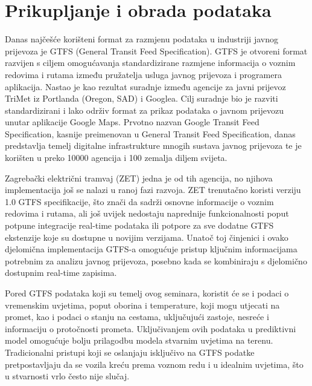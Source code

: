\documentclass[seminarskirad]{fer}
\begin{document}
\chapter{Prikupljanje i obrada podataka}
\label{pog:prikupljanje}

Danas najčešće korišteni format za razmjenu podataka u industriji javnog prijevoza je GTFS (General Transit Feed Specification). GTFS je otvoreni format razvijen s ciljem omogućavanja standardizirane razmjene informacija o voznim redovima i rutama između pružatelja usluga javnog prijevoza i programera aplikacija. Nastao je kao rezultat suradnje između agencije za javni prijevoz TriMet iz Portlanda (Oregon, SAD) i Googlea. Cilj suradnje bio je razviti standardizirani i lako održiv format za prikaz podataka o javnom prijevozu unutar aplikacije Google Maps. Prvotno nazvan Google Transit Feed Specification, kasnije preimenovan u General Transit Feed Specification, danas predstavlja temelj digitalne infrastrukture mnogih sustava javnog prijevoza te je korišten u preko 10000 agencija i 100 zemalja diljem svijeta\cite{article5}.

Zagrebački električni tramvaj (ZET) jedna je od tih agencija, no njihova implementacija još se nalazi u ranoj fazi razvoja. ZET trenutačno koristi verziju 1.0 GTFS specifikacije, što znači da  sadrži osnovne informacije o voznim redovima i rutama, ali još uvijek nedostaju naprednije funkcionalnosti poput potpune integracije real-time podataka ili potpore za sve dodatne GTFS ekstenzije koje su dostupne u novijim verzijama. Unatoč toj činjenici i ovako djelomična implementacija GTFS-a omogućuje pristup ključnim informacijama potrebnim za analizu javnog prijevoza, posebno kada se kombiniraju s djelomično dostupnim real-time zapisima.

Pored GTFS podataka koji su temelj ovog seminara, koristit će se i podaci o vremenskim uvjetima, poput oborina i temperature, koji mogu utjecati na promet, kao i podaci o stanju na cestama, uključujući zastoje, nesreće i informaciju o protočnosti prometa. Uključivanjem ovih podataka u prediktivni model omogućuje bolju prilagodbu modela stvarnim uvjetima na terenu. Tradicionalni pristupi koji se oslanjaju isključivo na GTFS podatke pretpostavljaju da se vozila kreću prema voznom redu i u idealnim uvjetima, što u stvarnosti vrlo često nije slučaj.
\end{document}
